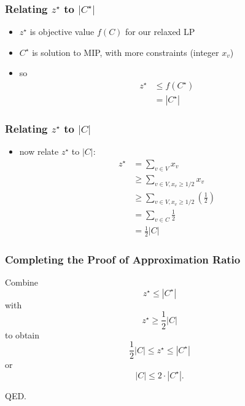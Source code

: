 \documentclass[10pt,aspectratio=169]{beamer}
\begin{document}
\begin{frame} \frametitle{Relating $z^\star$ to $|C^\star|$}
  \begin{itemize}
    \item $z^\star$ is objective value $f(C)$ for our relaxed LP
    \item $C^\star$ is solution to MIP, with more constraints (integer $x_v$)
    \item so
      \begin{align*}
        z^\star &\leq f(C^\star) \\
          &= |C^\star|
      \end{align*}
  \end{itemize}
\end{frame}

\begin{frame} \frametitle{Relating $z^\star$ to $|C|$}
  \begin{itemize}
    \item now relate $z^\star$ to $|C|:$
      \begin{align*}
        z^\star &= \sum_{v \in V} x_v \\
          &\geq \sum_{v \in V, x_v \geq 1/2} x_v \\
          &\geq \sum_{v \in V, x_v \geq 1/2} (\frac{1}{2}) \\
          &= \sum_{v \in C} \frac{1}{2} \\
          &= \frac{1}{2} |C|
      \end{align*}
\end{itemize}
\end{frame}

\begin{frame} \frametitle{Completing the Proof of Approximation Ratio}
  Combine
  \[ z^\star \leq |C^\star| \]
  with
  \[ z^\star \geq \frac{1}{2} |C| \]
  to obtain
  \[ \frac{1}{2} |C| \leq z^\star \leq |C^\star| \]
  or
  \[ |C| \leq 2 \cdot |C^\star| . \]

  QED.
\end{frame}
\end{document}
